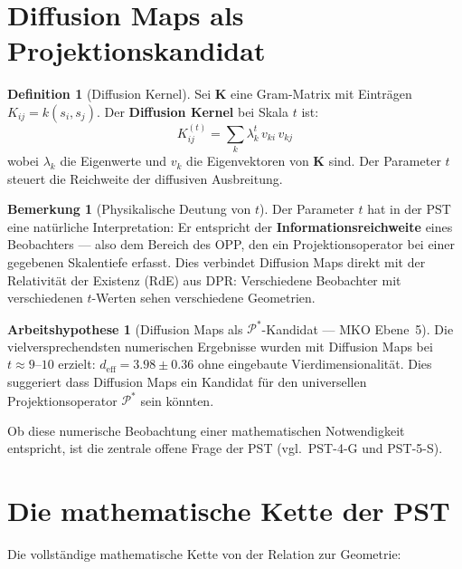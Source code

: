 \documentclass[11pt,a4paper]{article}
\theoremstyle{plain}
\theoremstyle{definition}
\newtheorem{definition}{Definition}[section]
\newtheorem{remark}{Bemerkung}[section]
\newtheorem{hypothese}{Arbeitshypothese}[section]
\newcommand{\Kmat}{\mathbf{K}}
\newcommand{\deff}{d_{\mathrm{eff}}}
\begin{document}
\section{Diffusion Maps als Projektionskandidat}

\begin{definition}[Diffusion Kernel]
Sei $\Kmat$ eine Gram-Matrix mit Eintr\"{a}gen $K_{ij} = k(s_i, s_j)$.
Der \textbf{Diffusion Kernel} bei Skala $t$ ist:
\[
  K^{(t)}_{ij} = \sum_k \lambda_k^t\, v_{ki}\, v_{kj}
\]
wobei $\lambda_k$ die Eigenwerte und $v_k$ die Eigenvektoren von $\Kmat$
sind. Der Parameter $t$ steuert die Reichweite der diffusiven Ausbreitung.
\end{definition}

\begin{remark}[Physikalische Deutung von $t$]
Der Parameter $t$ hat in der PST eine nat\"{u}rliche Interpretation: Er
entspricht der \textbf{Informationsreichweite} eines Beobachters ---
also dem Bereich des OPP, den ein Projektionsoperator bei einer
gegebenen Skalentiefe erfasst. Dies verbindet Diffusion Maps direkt mit
der Relativit\"{a}t der Existenz (RdE) aus DPR: Verschiedene Beobachter
mit verschiedenen $t$-Werten sehen verschiedene Geometrien.
\end{remark}

\begin{hypothese}[Diffusion Maps als $\mathcal{P}^\ast$-Kandidat ---
MKO Ebene~5]
Die vielversprechendsten numerischen Ergebnisse wurden mit Diffusion Maps
bei $t \approx 9$--$10$ erzielt: $\deff = 3.98 \pm 0.36$ ohne eingebaute
Vierdimensionalit\"{a}t. Dies suggeriert dass Diffusion Maps ein Kandidat
f\"{u}r den universellen Projektionsoperator $\mathcal{P}^\ast$ sein
k\"{o}nnten.

Ob diese numerische Beobachtung einer mathematischen Notwendigkeit
entspricht, ist die zentrale offene Frage der PST (vgl.\ PST-4-G und
PST-5-S).
\end{hypothese}

\section{Die mathematische Kette der PST}

Die vollst\"{a}ndige mathematische Kette von der Relation zur Geometrie:
\end{document}
